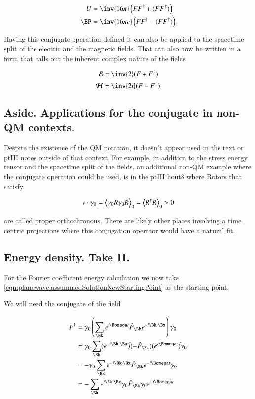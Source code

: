 \begin{align}
U &= \inv{16 \pi} \left(F F^\dagger + (F F^\dagger)^{\tilde{}} \right) \\
\BP &= \inv{16 \pi c} \left(F F^\dagger - (F F^\dagger)^{\tilde{}} \right)
\end{align}

Having this conjugate operation defined it can also be applied to the
spacetime split of the electric and the magnetic fields.  That can also now be written in a form
that calls out the inherent complex nature of the fields

\begin{align}
\EE &= \inv{2}(F + F^\dagger ) \\
\HH &= \inv{2i}(F - F^\dagger )
\end{align}

\subsection{Aside.  Applications for the conjugate in non-QM contexts. }

Despite the existence of the QM notation, it doesn't appear used in the text or ptIII notes outside of that context.
For example,
in addition to the
stress energy tensor and the spacetime split of the fields, an additional non-QM example
where the conjugate operation could be used, is in the ptIII hout8 where Rotors that satisfy

\begin{align}
v \cdot \gamma_0 = {\left\langle{{\gamma_0 R \gamma_0 \tilde{R}}}\right\rangle}_{0} = {\left\langle{{R^\dagger R}}\right\rangle}_{0} > 0
\end{align}

are called proper orthochronous.  There are likely other places involving a time centric projections where this
conjugation operator would have a natural fit.


\subsection{Energy density. Take II. }

For the Fourier coefficient energy calculation we now take \ref{eqn:planewave:assummedSolutionNewStartingPoint} as the starting point.

We will need the conjugate of the field

\begin{align*}
F^\dagger 
&= \gamma_0 
\left(
\sum_{\Bk} 
e^{i \Bomega t}
\hat{F}_{\Bk}
e^{-i \Bk \cdot \Bx}
\right)
^{\tilde{}}
\gamma_0 \\
&= \gamma_0 \sum_{\Bk} 
(e^{-i \Bk \cdot \Bx})^{\tilde{}}
(-\hat{F}_{\Bk})
(e^{i \Bomega t})^{\tilde{}}
\gamma_0 \\
&= -\gamma_0 \sum_{\Bk} 
e^{-i \Bk \cdot \Bx}
\hat{F}_{\Bk}
e^{-i \Bomega t}
\gamma_0 \\
&= -\sum_{\Bk} 
e^{i \Bk \cdot \Bx}
\gamma_0
\hat{F}_{\Bk}
\gamma_0
e^{-i \Bomega t}
\\
\end{align*}

